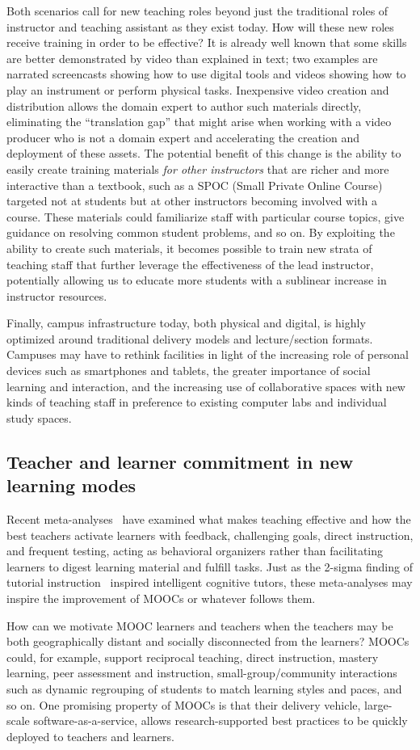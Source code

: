 Both scenarios call for new teaching roles beyond just the traditional
roles of instructor and teaching assistant as they exist today.
How will these new roles receive training in order to be effective?
It is already well known that some skills are better demonstrated by
video than explained in text; two examples are narrated screencasts
showing how to use digital tools and videos showing how to play an
instrument or perform physical tasks.
Inexpensive video creation and distribution allows the domain expert to
author such materials directly, eliminating the ``translation gap'' that
might arise when working with a video producer who is not a domain
expert and  accelerating the creation and deployment of these
assets.
The potential benefit of this change is the ability to easily create
training materials \emph{for other instructors} that are richer and more
interactive than a textbook, such as a
SPOC (Small Private Online Course) targeted not at students but at other
instructors becoming involved with a course.
These materials could familiarize staff with particular course topics,
give guidance on resolving common student problems, and so on.
By exploiting the ability to create such materials, it becomes possible
to train new strata of teaching staff that further leverage the
effectiveness of the lead instructor, potentially allowing us to educate
more students with a sublinear increase in instructor resources.

Finally, campus infrastructure today, both physical and digital, is
highly optimized around traditional delivery models and lecture/section
formats. 
Campuses may have to rethink facilities in light of the increasing role
of personal devices such as 
smartphones and tablets, the greater importance of social learning and
interaction, and the increasing use of collaborative spaces with new
kinds of teaching staff in
preference to existing computer labs and individual study spaces.

\subsection{Teacher and learner commitment in new learning modes}

Recent meta-analyses~\cite{hattie2009} have examined what makes teaching
effective and how the best teachers activate learners with feedback,
challenging goals, direct instruction, and frequent testing, acting as
behavioral organizers rather than facilitating learners to digest
learning material and fulfill tasks.
Just as the 2-sigma finding of tutorial instruction~\cite{twosigma} inspired
intelligent cognitive tutors, these meta-analyses may inspire the
improvement of MOOCs or
whatever follows them.

How can we motivate MOOC learners and teachers when the teachers may be
both geographically distant and socially disconnected from the learners?
MOOCs could, for example, support reciprocal teaching, direct
instruction, mastery learning, peer assessment and instruction,
small-group/community interactions such as dynamic regrouping of
students to match learning styles and paces, and so on.
One promising property of MOOCs is that their delivery vehicle,
large-scale software-as-a-service, allows research-supported best
practices to be quickly deployed to
teachers and learners.
